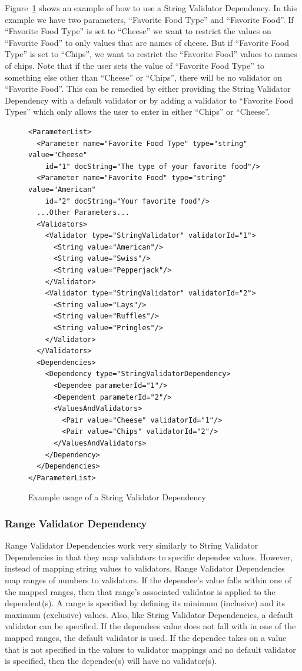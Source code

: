 Figure~\ref{StringValiDepXML} shows an example of how to use a String Validator Dependency. In this example we have two parameters, 
``Favorite Food Type''
and ``Favorite Food''. If ``Favorite Food Type'' is set to ``Cheese'' we want to restrict the values on ``Favorite Food'' to only values that are names
of cheese. But if ``Favorite Food Type'' is set to ``Chips'', we want to restrict the ``Favorite Food'' values to names of chips. Note that if the user
sets the value of ``Favorite Food Type'' to something else other than ``Cheese'' or ``Chips'', there will be no validator on ``Favorite Food''. This can
be remedied by either providing the String Validator Dependency with a default validator or by adding a validator to ``Favorite Food Types'' which only
allows the user to enter in either ``Chips'' or ``Cheese''.
\begin{figure}
\centering
{\footnotesize
\begin{Verbatim}
<ParameterList>
  <Parameter name="Favorite Food Type" type="string" value="Cheese"
    id="1" docString="The type of your favorite food"/>
  <Parameter name="Favorite Food" type="string" value="American"
    id="2" docString="Your favorite food"/>
  ...Other Parameters...
  <Validators>
    <Validator type="StringValidator" validatorId="1">
      <String value="American"/>
      <String value="Swiss"/>
      <String value="Pepperjack"/>
    </Validator>
    <Validator type="StringValidator" validatorId="2">
      <String value="Lays"/>
      <String value="Ruffles"/>
      <String value="Pringles"/>
    </Validator>
  </Validators>
  <Dependencies>
    <Dependency type="StringValidatorDependency>
      <Dependee parameterId="1"/>
      <Dependent parameterId="2"/>
      <ValuesAndValidators>
        <Pair value="Cheese" validatorId="1"/>
        <Pair value="Chips" validatorId="2"/>
      </ValuesAndValidators>
    </Dependency>
  </Dependencies>
</ParameterList>
\end{Verbatim}
}
\caption{Example usage of a String Validator Dependency}
\label{StringValiDepXML}
\end{figure}

\subsubsection{Range Validator Dependency}
Range Validator Dependencies work very similarly to String Validator Dependencies in that they map validators to specific dependee values. However,
instead of mapping string values to validators, Range Validator Dependencies map ranges of numbers to validators. If the dependee's value falls within one 
of the mapped ranges, then that range's associated validator is applied to the dependent(s). A range is specified by defining its minimum (inclusive) and 
its maximum (exclusive) values. Also, like String Validator Dependencies, a default validator can be specified. If the dependees value does not fall with 
in one of the mapped ranges, the default validator is used. If the dependee takes on a value that is not specified in the values to validator mappings and 
no default validator is specified, then the dependee(s) will have no validator(s).

